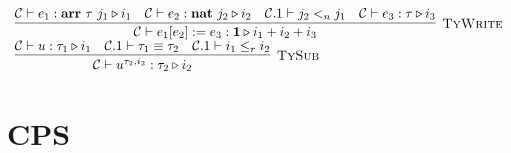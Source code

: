 \documentclass[fleqn]{article}
\begin{document}
\[\begin{array}{l}
    \infer[\textsc{TyWrite}]{\mathcal{C} \vdash e_1[e_2] := e_3 : \mathbf{1} \triangleright i_1 + i_2 + i_3}{\mathcal{C} \vdash e_1 : \mathbf{arr}~\tau~j_1 \triangleright i_1 & \mathcal{C} \vdash e_2 : \mathbf{nat}~j_2 \triangleright i_2 & \mathcal{C}.1 \vdash j_2 <_n j_1 & \mathcal{C} \vdash e_3 : \tau \triangleright i_3} \\
    \infer[\textsc{TySub}]{\mathcal{C} \vdash u^{\tau_2,i_2} : \tau_2 \triangleright i_2}{\mathcal{C} \vdash u : \tau_1 \triangleright i_1 & \mathcal{C}.1 \vdash \tau_1 \equiv \tau_2 & \mathcal{C}.1 \vdash i_1 \le_r i_2}
\end{array}
\]
\section{CPS}

\newcommand{\jty}[4]{#1 \vdash #2 : #3 \triangleright #4}
\newcommand{\jkd}[3]{#1 \vdash #2 :: #3}

\newcommand{\cpsty}[2]{\mathfrak{K}_{\mathrm{typing}}\left\llbracket #1 \right\rrbracket \left( #2 \right)}
\newcommand{\cpskd}[1]{\mathfrak{K}_{\mathrm{kinding}}\left\llbracket #1 \right\rrbracket}

\newcommand{\cpsc}[1]{\mathfrak{K}_{\mathrm{cstr}}\llbracket #1 \rrbracket}
\newcommand{\cpst}[2]{\mathfrak{K}_{\mathrm{term}}\llbracket #1 \rrbracket ( #2 )}

\newcommand{\wrapty}[1]{\mathfrak{W}_{\mathrm{typing}}\left\llbracket #1 \right\rrbracket}

\newcommand{\cloty}[1]{\mathfrak{C}_{\mathrm{typing}}\left\llbracket #1 \right\rrbracket}
\newcommand{\clokd}[1]{\mathfrak{C}_{\mathrm{kinding}}\left\llbracket #1 \right\rrbracket}
\newcommand{\cloc}[1]{\mathfrak{C}_{\mathrm{cstr}}\left\llbracket #1 \right\rrbracket}
\newcommand{\cloctx}[1]{\mathfrak{C}_{\mathrm{context}}\left\llbracket #1 \right\rrbracket}
\end{document}
